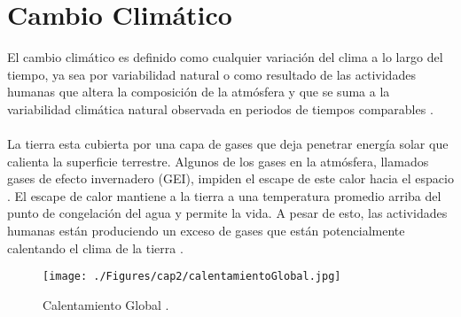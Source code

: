 \newpage{\ } 
\thispagestyle{empty} 

\chapter{Cambio Clim\'atico}


El cambio clim\'atico es definido como cualquier variaci\'on del clima a lo largo del tiempo, ya sea por variabilidad natural o como resultado de las actividades humanas que altera la composici\'on de la atm\'osfera y que se suma a la variabilidad clim\'atica natural observada en periodos de tiempos comparables \cite{robert2002captura}.\\~\\
La tierra esta cubierta por una capa de gases que deja penetrar energ\'ia solar que calienta la superficie terrestre. Algunos de los gases en la atm\'osfera, llamados gases de efecto invernadero (GEI), impiden el escape de este calor hacia el espacio . El escape de calor  mantiene a la tierra a una temperatura promedio arriba del punto de congelaci\'on del agua y permite la vida. A pesar de esto, las actividades humanas est\'an produciendo un exceso de gases que est\'an potencialmente calentando el clima de la tierra \cite{almando2014estimacion}.
    \begin{figure}[!hbtp]
    	\centering
    	\texttt{[image: ./Figures/cap2/calentamientoGlobal.jpg]}
    	\caption{Calentamiento Global \cite{calent2015global}.}
    	\label{fig:cambioClimatico}
    \end{figure}


